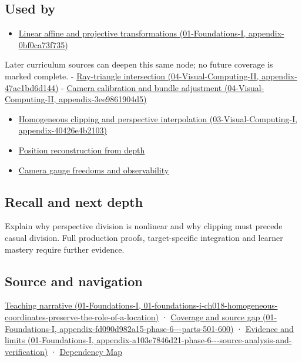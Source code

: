 \subsection{Used by}\label{appendix-cb3b26862282-used-by}

\begin{itemize}
\tightlist
\item
  \href{../01-Foundations-I/main.pdf\#nameddest=appendix-0bf0ca73f735}{Linear affine and projective transformations (01-Foundations-I, appendix-0bf0ca73f735)}
\end{itemize}

Later curriculum sources can deepen this same node; no future coverage is marked complete. - \href{../04-Visual-Computing-II/main.pdf\#nameddest=appendix-47ac1bd6d144}{Ray-triangle intersection (04-Visual-Computing-II, appendix-47ac1bd6d144)} - \href{../04-Visual-Computing-II/main.pdf\#nameddest=appendix-3ee9861904d5}{Camera calibration and bundle adjustment (04-Visual-Computing-II, appendix-3ee9861904d5)}

\begin{itemize}
\tightlist
\item
  \href{../03-Visual-Computing-I/main.pdf\#nameddest=appendix-40426e4b2103}{Homogeneous clipping and perspective interpolation (03-Visual-Computing-I, appendix-40426e4b2103)}
\item
  \hyperref[appendix-2cbf2968e866]{Position reconstruction from depth}
\item
  \hyperref[appendix-113f0267e5f4]{Camera gauge freedoms and observability}
\end{itemize}

\subsection{Recall and next depth}\label{appendix-cb3b26862282-recall-and-next-depth}

Explain why perspective division is nonlinear and why clipping must precede casual division. Full production proofs, target-specific integration and learner mastery require further evidence.

\subsection{Source and navigation}\label{appendix-cb3b26862282-source-and-navigation}

\href{../01-Foundations-I/main.pdf\#nameddest=01-foundations-i-ch018-homogeneous-coordinates-preserve-the-role-of-a-location}{Teaching narrative (01-Foundations-I, 01-foundations-i-ch018-homogeneous-coordinates-preserve-the-role-of-a-location)} · \href{../01-Foundations-I/main.pdf\#nameddest=appendix-fd090d982a15-phase-6---parts-501-600}{Coverage and source gap (01-Foundations-I, appendix-fd090d982a15-phase-6-\/-\/-parts-501-600)} · \href{../01-Foundations-I/main.pdf\#nameddest=appendix-a103e7846d21-phase-6---source-analysis-and-verification}{Evidence and limits (01-Foundations-I, appendix-a103e7846d21-phase-6-\/-\/-source-analysis-and-verification)} · \hyperref[appendix-4ad47bdd269a]{Dependency Map}

